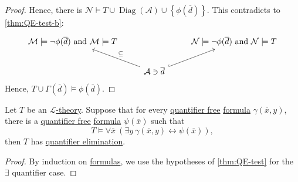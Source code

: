 \begin{proof}
	Hence, there is \(\mathcal{N} \models T \cup \mathop{\mathrm{Diag}}(\mathcal{A} ) \cup \left\{ \phi (\overline{d} ) \right\} \). This contradicts to \autoref{thm:QE-test-b}:
	\[\begin{tikzcd}
			{\mathcal{M}\models \lnot\phi(\overline{d})\text{ and }\mathcal{M}\models T} && {\mathcal{N}\models \lnot\phi(\overline{d})\text{ and }\mathcal{N}\models T} \\
			& {\mathcal{A}\ni \overline{d}}
			\arrow[hook, from=2-2, to=1-3]
			\arrow["\subseteq"', from=2-2, to=1-1]
		\end{tikzcd}\]
	Hence, \(T \cup \Gamma (\overline{d} ) \models \phi (\overline{d} )\).
\end{proof}

\begin{lemma}\label{lma:QE-test}
	Let \(T\) be an \hyperref[def:theory]{\(\mathcal{L} \)-theory}. Suppose that for every \hyperref[not:quantifier-free]{quantifier free} \hyperref[def:formula]{formula} \(\gamma (\overline{x} , y)\), there is a \hyperref[not:quantifier-free]{quantifier free} \hyperref[def:formula]{formula} \(\psi (\overline{x} )\) such that
	\[
		T \models \forall \overline{x} \ (\exists y\ \gamma (\overline{x} , y) \leftrightarrow \psi (\overline{x} )),
	\]
	then \(T\) has \hyperref[def:quantifier-elimination]{quantifier elimination}.
\end{lemma}
\begin{proof}
	By induction on \hyperref[def:formula]{formulas}, we use the hypotheses of \autoref{thm:QE-test} for the \(\exists \) quantifier case.
\end{proof}

